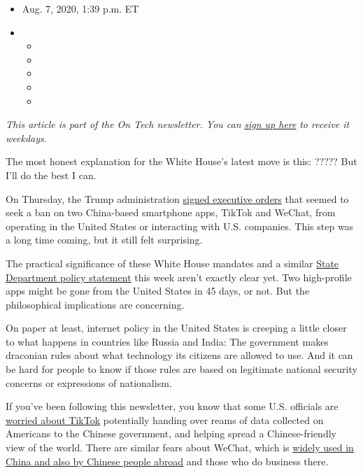 \begin{itemize}
\item
  Aug. 7, 2020, 1:39 p.m. ET
\item
  \begin{itemize}
  \item
  \item
  \item
  \item
  \item
  \end{itemize}
\end{itemize}

\emph{This article is part of the On Tech newsletter. You can}
\href{https://www.nytimes3xbfgragh.onion/newsletters/signup/OT}{\emph{sign
up here}} \emph{to receive it weekdays.}

The most honest explanation for the White House's latest move is this:
????? But I'll do the best I can.

On Thursday, the Trump administration
\href{https://www.nytimes3xbfgragh.onion/2020/08/06/technology/trump-wechat-tiktok-china.html}{signed
executive orders} that seemed to seek a ban on two China-based
smartphone apps, TikTok and WeChat, from operating in the United States
or interacting with U.S. companies. This step was a long time coming,
but it still felt surprising.

The practical significance of these White House mandates and a similar
\href{https://www.state.gov/announcing-the-expansion-of-the-clean-network-to-safeguard-americas-assets/}{State
Department policy statement} this week aren't exactly clear yet. Two
high-profile apps might be gone from the United States in 45 days, or
not. But the philosophical implications are concerning.

On paper at least, internet policy in the United States is creeping a
little closer to what happens in countries like Russia and India: The
government makes draconian rules about what technology its citizens are
allowed to use. And it can be hard for people to know if those rules are
based on legitimate national security concerns or expressions of
nationalism.

If you've been following this newsletter, you know that some U.S.
officials are
\href{https://www.nytimes3xbfgragh.onion/2020/07/26/technology/tiktok-china-ban-model.html}{worried
about TikTok} potentially handing over reams of data collected on
Americans to the Chinese government, and helping spread a
Chinese-friendly view of the world. There are similar fears about
WeChat, which is
\href{https://www.nytimes3xbfgragh.onion/2020/08/07/business/trump-china-wechat-tiktok.html}{widely
used in China and also by Chinese people abroad} and those who do
business there.

